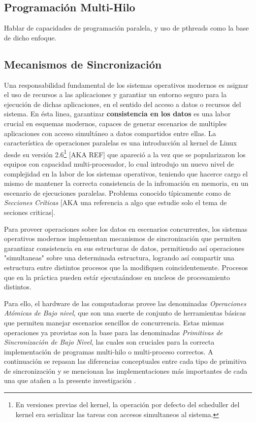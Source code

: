 \subsection{Programación Multi-Hilo}
Hablar de capacidades de programación paralela, y uso de pthreads como la base de dicho enfoque.

\subsection{Mecanismos de Sincronización}
Una responsabilidad fundamental de los sistemas operativos modernos es asignar el uso de recursos a las aplicaciones y garantiar un entorno seguro para la ejecución de dichas aplicaciones, en el sentido del acceso a datos o recursos del sistema. En ésta linea, garantizar \textbf{consistencia en los datos} es una labor crucial en esquemas modernos, capaces de generar escenarios de multiples aplicaciones con acceso simultáneo a datos compartidos entre ellas. La característica de operaciones paralelas es una introducción al kernel de Linux desde su versión 2.6\footnote{En versiones previas del kernel, la operación por defecto del scheduller del kernel era serializar las tareas con accesos simultaneos al sistema.} [AKA REF] que apareció a la vez que se popularizaron los equipos con capacidad multi-procesador, lo cual introdujo un nuevo nivel de complejidad en la labor de los sistemas operativos, teniendo que hacerce cargo el mismo de mantener la correcta consistencia de la infromación en memoria, en un escenario de ejecuciones paralelas. Problema conocido típicamente como de \emph{Secciones Críticas} [AKA una referencia a algo que estudie solo el tema de seciones criticas].

Para proveer operaciones sobre los datos en escenarios concurrentes, los sistemas operativos modernos implementan mecanismos de sincronización que permiten garantizar consistencia en sus estructuras de datos, permitiendo así operaciones "simultaneas" sobre una determinada estructura, logrando así compartir una estructura entre distintos procesos que la modifiquen coincidentemente. Procesos que en la práctica pueden estár ejecutaándose en nucleos de procesamiento distintos.

Para ello, el hardware de las computadoras provee las denominadas \emph{Operaciones Atómicas de Bajo nivel}, que son una suerte de conjunto de herramientas básicas que permiten manejar escenarios sencillos de concurrencia. Estas mismas operaciones ya provistas son la base para las denominadas \emph{Primitivas de Sincronización de Bajo Nivel}, las cuales son cruciales para la correcta implementación de programas multi-hilo o multi-proceso correctos. A continuación se repasan las diferencias conceptuales entre cada tipo de primitiva de sincronización y se mencionan las implementaciones más importantes de cada una que atañen a la presente investigación \cite{book:SOConcepts}.

